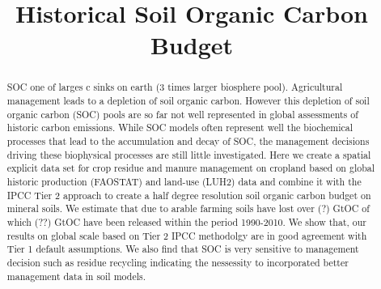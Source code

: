 \documentclass[gc, manuscript]{copernicus}
\begin{document}
\title{Historical Soil Organic Carbon Budget}














\received{}
\pubdiscuss{} %
\revised{}
\accepted{}
\published{}




\maketitle


\begin{abstract}
SOC one of larges c sinks on earth (3 times larger biosphere pool).
Agricultural management leads to a depletion of soil organic carbon.
However this depletion of soil organic carbon (SOC) pools are so far not
well represented in global assessments of historic carbon emissions.
While SOC models often represent well the biochemical processes that
lead to the accumulation and decay of SOC, the management decisions
driving these biophysical processes are still little investigated. Here
we create a spatial explicit data set for crop residue and manure
management on cropland based on global historic production (FAOSTAT) and
land-use (LUH2) data and combine it with the IPCC Tier 2 approach to
create a half degree resolution soil organic carbon budget on mineral
soils. We estimate that due to arable farming soils have lost over (?)
GtOC of which (??) GtOC have been released within the period 1990-2010.
We show that, our results on global scale based on Tier 2 IPCC
methodolgy are in good agreement with Tier 1 default assumptions. We
also find that SOC is very sensitive to management decision such as
residue recycling indicating the nessessity to incorporated better
management data in soil models.
\end{abstract}
\end{document}
